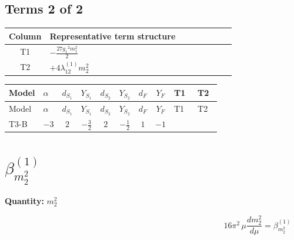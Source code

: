 \documentclass[8pt]{article}
\begin{document}
\begin{landscape}
\subsection*{Terms 2 of 2}
\begin{center}
\begin{tabular}{@{}c >{\raggedright\arraybackslash}p{0.82\linewidth}@{}}
\toprule
Column & Representative term structure \\
\midrule
T1 & \(\displaystyle -\frac{27 {g_1}^2 {m_1^2}}{2}\) \\
\midrule
T2 & \(\displaystyle +4 {\lambda_{12}^{(1)}} {m_2^2}\) \\
\midrule
\bottomrule
\end{tabular}
\end{center}
\smallskip
\tiny
\begin{longtable}{@{}llcccccc >{\raggedright\arraybackslash}p{0.21\linewidth} >{\raggedright\arraybackslash}p{0.21\linewidth}@{}}
\toprule
Model & $\alpha$ & $d_{S_1}$ & $Y_{S_1}$ & $d_{S_2}$ & $Y_{S_2}$ & $d_F$ & $Y_F$ & T1 & T2 \\
\midrule
\endfirsthead
\toprule
Model & $\alpha$ & $d_{S_1}$ & $Y_{S_1}$ & $d_{S_2}$ & $Y_{S_2}$ & $d_F$ & $Y_F$ & T1 & T2 \\
\midrule
\endhead
T3-B & $-3$ & $2$ & $-\frac{3}{2}$ & $2$ & $-\frac{1}{2}$ & $1$ & $-1$ & \scriptsize\adjustbox{max width=\linewidth}{$\begin{gathered} -\frac{27 {g_1}^2 {m_1^2}}{2}\end{gathered}$} & \scriptsize\adjustbox{max width=\linewidth}{$\begin{gathered} +4 {\lambda_{12}^{(1)}} {m_2^2}\end{gathered}$} \\
\midrule
\bottomrule
\end{longtable}
\clearpage
\section*{$\beta_{m_2^2}^{(1)}$}
\noindent\textbf{Quantity: }$m_2^2$\par\smallskip
\[16\pi^2\,\mu\frac{d m_2^2}{d\mu}=\beta_{m_2^2}^{(1)}\]

\end{landscape}
\end{document}
